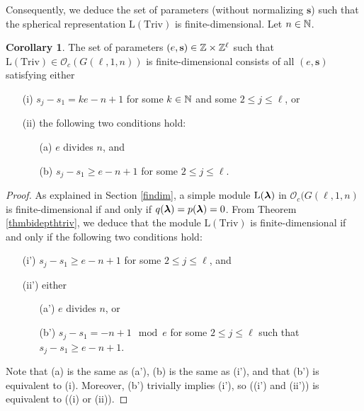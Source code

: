 \documentclass[12pt]{amsart}
\numberwithin{equation}{section}
\theoremstyle{definition}
\newtheorem{corollary}[equation]{Corollary}
\newcommand{\oh}{\mathcal{O}}
\newcommand{\el}{\mathrm{L}}
\newcommand{\mbs}{\mathbf{s}}
\newcommand{\triv}{\mathrm{Triv}}
\begin{document}
Consequently, we deduce the set of parameters (without normalizing $\mbs$) such that the spherical representation $\el(\triv)$ is finite-dimensional. Let $n\in\mathbb{N}$.
\begin{corollary}\label{cortrivfd}
The set of parameters $(e,\mbs)\in\Z\times\Z^\ell$ such that $\el(\triv)\in\oh_c(G(\ell,1,n))$ is finite-dimensional consists of all $(e,\mbs)$ satisfying either
\begin{itemize}
 \item[(i)] $s_j-s_1=ke-n+1$ for some $k\in\mathbb{N}$ and some $2\leq j\leq \ell$, or 
 \item[(ii)] the following two conditions hold:
 \begin{itemize}
\item[(a)] $e$ divides $n$, and 
\item[(b)] $s_j-s_1\geq e-n+1$ for some $2\leq j\leq \ell$.
\end{itemize}
\end{itemize}
\end{corollary}
\begin{proof}
As explained in Section \ref{findim}, a simple module $\el(\bla)$ in $\oh_c(G(\ell,1,n)$ is finite-dimensional if and only if $q(\boldsymbol{\lambda})=p(\boldsymbol{\lambda})=0$.
From Theorem \ref{thmbidepthtriv}, we deduce that the module $\el(\triv)$
is finite-dimensional if and only if the following two conditions hold:
\begin{itemize}
 \item[(i')] $s_j-s_1\geq e-n+1$ for some $2\leq j\leq \ell$, and
 \item[(ii')] either 
 \begin{itemize}
\item[(a')] $e$ divides $n$, or
\item[(b')] $s_j-s_1 =-n+1 \mod e$ for some $2\leq j\leq \ell$ such that $s_j-s_1\geq e-n+1$.
\end{itemize}
\end{itemize}
Note that (a) is the same as (a'), (b) is the same as (i'), and that 
(b') is equivalent to (i). Moreover, (b') trivially implies (i'),
so ((i') and (ii')) is equivalent to ((i) or (ii)).
\end{proof}
\end{document}
